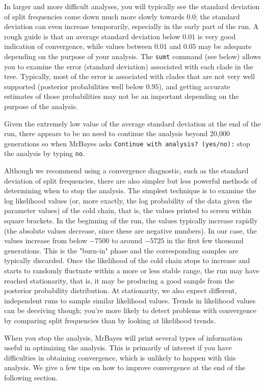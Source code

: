 \documentclass[12pt]{book}
\begin{document}
In larger and more difficult analyses, you will typically see the standard deviation of split frequencies 
come down much more slowly towards 0.0; the standard deviation can even increase temporarily, especially in 
the early part of the run. A rough guide is that an average standard deviation below $0.01$ is very good 
indication of convergence, while values between $0.01$ and $0.05$ may be adequate depending on the purpose 
of your analysis. The \texttt{sumt} command (see below) allows you to examine the error (standard deviation) 
associated with each clade in the tree. Typically, most of the error is associated with clades that are not 
very well supported (posterior probabilities well below $0.95$), and getting accurate estimates of those 
probabilities may not be an important depending on the purpose of the analysis.

Given the extremely low value of the average standard deviation at the end of the run, there appears to be 
no need to continue the analysis beyond 20,000 generations so when MrBayes asks \texttt{Continue with 
analysis? (yes/no):} stop the analysis by typing \texttt{no}.

Although we recommend using a convergence diagnostic, such as the standard deviation of split frequencies, 
there are also simpler but less powerful methods of determining when to stop the analysis. The simplest 
technique is to examine the log likelihood values (or, more exactly, the log probability of the data given 
the parameter values) of the cold chain, that is, the values printed to screen within square brackets. In 
the beginning of the run, the values typically increase rapidly (the absolute values decrease, since these 
are negative numbers). In our case, the values increase from below $-7500$ to around $-5725$ in the first 
few thousand generations. This is the "burn-in" phase and the corresponding samples are typically discarded. 
Once the likelihood of the cold chain stops to increase and starts to randomly fluctuate within a more or 
less stable range, the run may have reached stationarity, that is, it may be producing a good sample from 
the posterior probability distribution. At stationarity, we also expect different, independent runs to 
sample similar likelihood values. Trends in likelihood values can be deceiving though; you're more likely to 
detect problems with convergence by comparing split frequencies than by looking at likelihood trends.

When you stop the analysis, MrBayes will print several types of information useful in optimizing the 
analysis. This is primarily of interest if you have difficulties in obtaining convergence, which is unlikely 
to happen with this analysis. We give a few tips on how to improve convergence at the end of the following 
section.
\end{document}
